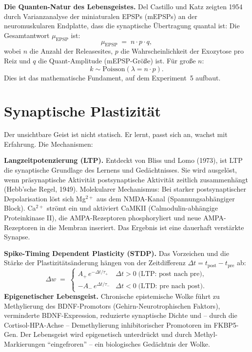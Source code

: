 ﻿\documentclass[12pt,a4paper]{report}
\theoremstyle{plain}
\theoremstyle{definition}
\theoremstyle{remark}
\begin{document}
	\textbf{Die Quanten-Natur des Lebensgeistes.}
	Del Castillo und Katz zeigten 1954 durch Varianzanalyse der miniaturalen
	EPSPs (mEPSPs) an der neuromuskularen Endplatte, dass die synaptische
	Übertragung quantal ist: Die Gesamtantwort $\mu_{\mathrm{EPSP}}$ ist:
	\[
	\mu_{\mathrm{EPSP}} \;=\; n \cdot p \cdot q,
	\]
	wobei $n$ die Anzahl der Releasesites, $p$ die
	Wahrscheinlichkeit der Exozytose pro Reiz und $q$ die
	Quant-Amplitude (mEPSP-Grö\ss{}e) ist. Für gro\ss{}e $n$:
	\[
	k \sim \mathrm{Poisson}(\lambda = n \cdot p).
	\]
	Dies ist das mathematische Fundament, auf dem Experiment~5 aufbaut.
	
	\section{Synaptische Plastizität}
	
	Der unsichtbare Geist ist nicht statisch. Er lernt, passt sich an,
	wachst mit Erfahrung. Die Mechanismen:
	
	\textbf{Langzeitpotenzierung (LTP).}
	Entdeckt von Bliss und Lomo (1973), ist LTP die synaptische Grundlage
	des Lernens und Gedächtnisses. Sie wird ausgelöst, wenn
	präsynaptische Aktivität postsynaptische Aktivität zeitlich
	zusammenhängt (Hebb'sche Regel, 1949).
	Molekularer Mechanismus: Bei starker postsynaptischer Depolarisation
	löst sich Mg$^{2+}$ aus dem NMDA-Kanal (Spannungsabhängiger Block).
	Ca$^{2+}$ strömt ein und aktiviert CaMKII (Calmodulin-abhängige
	Proteinkinase II), die AMPA-Rezeptoren phosphoryliert und neue AMPA-Rezeptoren
	in die Membran inseriert. Das Ergebnis ist eine dauerhaft verstärkte Synapse.
	
	\textbf{Spike-Timing Dependent Plasticity (STDP).}
	Das Vorzeichen und die Stärke der Plastizitätsänderung hängen
	von der Zeitdifferenz $\Delta t = t_{\mathrm{post}} - t_{\mathrm{pre}}$ ab:
	\[
	\Delta w \;=\;
	\begin{cases}
		A_+ \, e^{-\Delta t / \tau_+} & \Delta t > 0 \;\text{(LTP: post nach pre)},\\
		-A_- \, e^{\Delta t  / \tau_-} & \Delta t < 0 \;\text{(LTD: pre nach post)}.
	\end{cases}
	\]
	\textbf{Epigenetischer Lebensgeist.}
	Chronische epistemische Wolke führt zu Methylierung des BDNF-Promotors
	(Gehirn-Neurotrophischen Faktors), verminderte BDNF-Expression,
	reduzierte synaptische Dichte und -- durch die Cortisol-HPA-Achse --
	Demethylierung inhibitorischer Promotoren im FKBP5-Gen.
	Der Lebensgeist wird epigenetisch unterdrückt und durch Methyl-
	Markierungen ``eingefroren'' -- ein biologisches Gedächtnis der Wolke.
	
\end{document}
